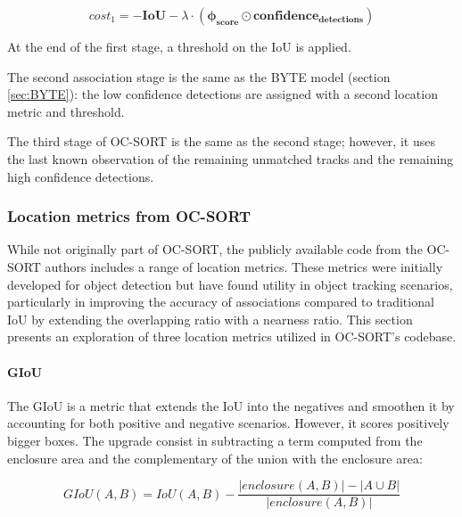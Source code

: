 \begin{equation}
    \label{eqn:OC-SORT first association cost}
    cost_{1} = -\mathbf{IoU} - \lambda \cdot (\mathbf{\phi_{score}} \odot \mathbf{confidence_{detections}})
\end{equation}

{
    At the end of the first stage, a threshold on the \ac{IoU} is applied.
}

{
    The second association stage is the same as the \ac{BYTE} model (section \ref{sec:BYTE}): 
    the low confidence detections are assigned with a second location metric and threshold.
}
 
{
    The third stage of \ac{OC-SORT} is the same as the second stage; 
    however, it uses the last known observation of the remaining unmatched tracks and the remaining high confidence detections.
}

\subsubsection{Location metrics from OC-SORT}

{
    While not originally part of OC-SORT, the publicly available code from the OC-SORT authors includes a range of location metrics. 
    These metrics were initially developed for object detection but have found utility in object tracking scenarios, 
    particularly in improving the accuracy of associations compared to traditional \ac{IoU} by extending the overlapping ratio with a nearness ratio. 
    This section presents an exploration of three location metrics utilized in OC-SORT's codebase.
}

\paragraph{GIoU} 

{
    The \acl{GIoU}\cite{Rezatofighi_2018_CVPR} is a metric that extends the \ac{IoU} into the negatives and smoothen it by accounting for both positive and negative scenarios.
    However, it scores positively bigger boxes. 
    The upgrade consist in subtracting a term computed from the enclosure area and the complementary of the union with the enclosure area:
}


\begin{equation}
    \label{eqn:GIoU}
    GIoU(A, B) = IoU(A, B) - \frac{|enclosure(A, B)| - |A \cup B|}{|enclosure(A, B)|}
\end{equation}



